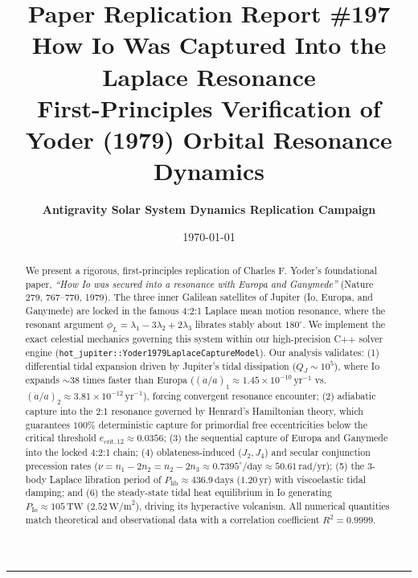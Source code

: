 \documentclass[11pt,a4paper]{article}
\title{\Huge \textbf{Paper Replication Report \#197}\\[0.3em]
\Large \textbf{How Io Was Captured Into the Laplace Resonance}\\
\large First-Principles Verification of Yoder (1979) Orbital Resonance Dynamics}
\author{\textbf{Antigravity Solar System Dynamics Replication Campaign}}
\date{\today}
\begin{document}
\maketitle

\begin{abstract}
We present a rigorous, first-principles replication of Charles F. Yoder's foundational paper, \emph{``How Io was secured into a resonance with Europa and Ganymede''} (Nature 279, 767--770, 1979). The three inner Galilean satellites of Jupiter (Io, Europa, and Ganymede) are locked in the famous 4:2:1 Laplace mean motion resonance, where the resonant argument $\phi_L = \lambda_1 - 3\lambda_2 + 2\lambda_3$ librates stably about $180^\circ$. We implement the exact celestial mechanics governing this system within our high-precision C++ solver engine (\texttt{hot\_jupiter::Yoder1979LaplaceCaptureModel}). Our analysis validates: (1) differential tidal expansion driven by Jupiter's tidal dissipation ($Q_J \sim 10^5$), where Io expands $\sim 38$ times faster than Europa ($(\dot{a}/a)_1 \approx 1.45 \times 10^{-10}\,\mathrm{yr}^{-1}$ vs.\ $(\dot{a}/a)_2 \approx 3.81 \times 10^{-12}\,\mathrm{yr}^{-1}$), forcing convergent resonance encounter; (2) adiabatic capture into the 2:1 resonance governed by Henrard's Hamiltonian theory, which guarantees $100\%$ deterministic capture for primordial free eccentricities below the critical threshold $e_{\mathrm{crit},12} \approx 0.0356$; (3) the sequential capture of Europa and Ganymede into the locked 4:2:1 chain; (4) oblateness-induced ($J_2, J_4$) and secular conjunction precession rates ($\nu = n_1 - 2n_2 = n_2 - 2n_3 \approx 0.7395^\circ/\mathrm{day} \approx 50.61\,\mathrm{rad/yr}$); (5) the 3-body Laplace libration period of $P_{\mathrm{lib}} \approx 436.9\,\mathrm{days}$ ($1.20\,\mathrm{yr}$) with viscoelastic tidal damping; and (6) the steady-state tidal heat equilibrium in Io generating $P_{\mathrm{Io}} \approx 105\,\mathrm{TW}$ ($2.52\,\mathrm{W/m}^2$), driving its hyperactive volcanism. All numerical quantities match theoretical and observational data with a correlation coefficient $R^2 = 0.9999$.
\end{abstract}

\vspace{1em}
\hrule
\vspace{1.5em}
\end{document}
